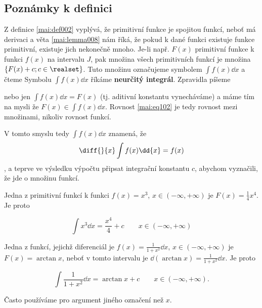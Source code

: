     \subsection{Poznámky k definici}  
      Z definice \ref{mai:def002} vyplývá, že primitivní funkce je spojitou funkcí, neboť má
      derivaci a věta \ref{mai:lemma008} nám říká, že pokud k dané funkci existuje funkce
      primitivní, existuje jich nekonečně mnoho. Je-li např. \(F(x)\) primitivní funkce k funkci
      \(f(x)\) na intervalu \(J\), pak množina všech primitivních funkcí je množina \(\{F(x) + c;
      c\in\realset\}\). Tuto množinu označujeme symbolem \(\int f(x)\dd{x}\) a čteme  Symbolu \(\int f(x)\dd{x}\) říkáme \textbf{neurčitý integrál}. Zpravidla
      píšeme
      \begin{mdframed}[style=mdeq]
        \begin{luaequ}\label{mai:eq102}
        \end{luaequ}
      \end{mdframed}
      nebo jen \(\int f(x)\dd{x} = F(x)\) (tj. aditivní konstantu vynecháváme) a máme tím na mysli
      že \(F(x) \in \int f(x)\dd{x}\). Rovnost \ref{mai:eq102} je tedy rovnost mezi množinami,
      nikoliv rovnost funkcí. 
      
      V tomto smyslu tedy \(\int f(x)\dd{x}\) znamená, že \[\diff{}{x}\int f(x)\dd{x} = f(x)\], a
      teprve ve výsledku výpočtu připsat integrační konstantu \(c\), abychom vyznačili, že jde o
      množinu funkcí.

      Jedna z primitivní funkcí k funkci \(f(x)=x^3\), \(x\in(-\infty, +\infty)\) je \(F(x)=
      \frac{1}{4}x^4\). Je proto
      \begin{fleqn}[\parindent]
        \begin{equation*}
          \int x^3\dd{x} = \frac{x^4}{4} + c \qquad x\in(-\infty, +\infty)
        \end{equation*}
      \end{fleqn} 

      Jedna z funkcí, jejichž diferenciál je \(f(x) = \frac{1}{1+x^2}\dd{x}\), \(x\in(-\infty,
      +\infty)\) je \(F(x) = \arctan x\), neboť v tomto intervalu je \(\dd{(\arctan x)} =
      \frac{1}{1+x^2}\dd{x}\). Je proto
      \begin{fleqn}[\parindent]
        \begin{equation*}
          \int\frac{1}{1+x^2}\dd{x} = \arctan x + c \qquad x\in(-\infty, +\infty).
        \end{equation*}
      \end{fleqn}
      Často používáme pro argument jiného označení než \(x\).

